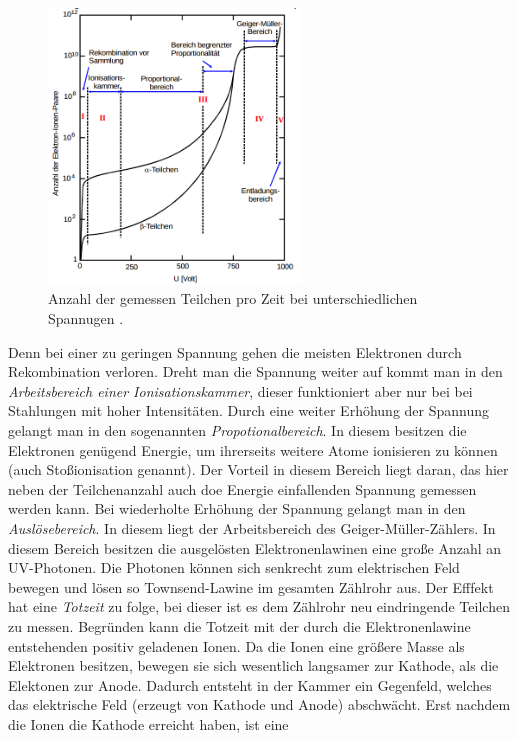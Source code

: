 \begin{figure}
  \centering
  \includegraphics[width=0.6\textwidth]{bilder/diagramm.png}
  \caption{Anzahl der gemessen Teilchen pro Zeit bei unterschiedlichen Spannugen \cite{anleitung703}.}
  \label{fig:teilchen_spannung}
\end{figure}
Denn bei einer zu geringen Spannung
gehen die meisten Elektronen durch Rekombination verloren. Dreht man die Spannung weiter auf
kommt man in den \emph{Arbeitsbereich einer Ionisationskammer}, dieser funktioniert aber nur bei
bei Stahlungen mit hoher Intensitäten. Durch eine weiter Erhöhung der Spannung gelangt man
in den sogenannten \emph{Propotionalbereich}. In diesem besitzen die Elektronen
genügend Energie, um ihrerseits weitere Atome ionisieren zu können (auch Stoßionisation genannt).
Der Vorteil in diesem Bereich liegt daran, das hier neben der Teilchenanzahl auch doe Energie
einfallenden Spannung gemessen werden kann. Bei wiederholte Erhöhung der Spannung
gelangt man in den \emph{Auslösebereich}. In diesem liegt der Arbeitsbereich des
Geiger-Müller-Zählers. In diesem Bereich besitzen die ausgelösten Elektronenlawinen
eine große Anzahl an UV-Photonen. Die Photonen können sich senkrecht zum elektrischen Feld bewegen
und lösen so Townsend-Lawine im gesamten Zählrohr aus. Der Efffekt hat eine
\emph{Totzeit} zu folge, bei dieser ist es dem Zählrohr neu eindringende Teilchen
zu messen. Begründen kann die Totzeit mit der durch die Elektronenlawine entstehenden
positiv geladenen Ionen. Da die Ionen eine größere Masse als Elektronen besitzen,
bewegen sie sich wesentlich langsamer zur Kathode, als die Elektonen
zur Anode. Dadurch entsteht in der Kammer ein Gegenfeld, welches das
elektrische Feld (erzeugt von Kathode und Anode) abschwächt.
Erst nachdem die Ionen die Kathode erreicht haben, ist eine
